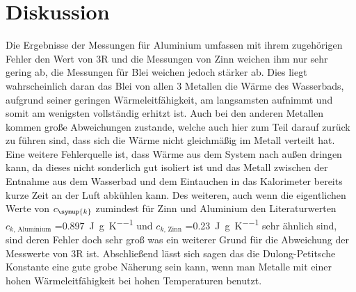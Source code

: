 \section{Diskussion}
\label{sec:Diskussion}
Die Ergebnisse der Messungen für Aluminium umfassen mit
ihrem zugehörigen Fehler den Wert von 3R und die Messungen von Zinn
weichen ihm nur sehr gering ab, die Messungen für Blei weichen jedoch
stärker ab. Dies liegt wahrscheinlich daran das Blei von allen
3 Metallen die Wärme des Wasserbads, aufgrund seiner geringen
Wärmeleitfähigkeit, am langsamsten aufnimmt und somit am wenigsten
vollständig erhitzt ist. Auch bei den anderen Metallen kommen große
Abweichungen zustande, welche auch hier zum Teil darauf zurück zu führen
sind, dass sich die Wärme nicht gleichmäßig im Metall verteilt hat.
Eine weitere Fehlerquelle ist, dass Wärme aus dem System nach außen dringen
kann, da dieses nicht sonderlich gut isoliert ist und das Metall zwischen
der Entnahme aus dem Wasserbad und dem Eintauchen in das Kalorimeter
bereits kurze Zeit an der Luft abkühlen kann. Des weiteren,
auch wenn die eigentlichen Werte von $c_\symup{k}$ zumindest für
Zinn und Aluminium den Literaturwerten\cite{chemie} $c_{k\text{, Aluminium}}$ =\SI{0,897}
{\joule\per\gram\per\kelvin} und $c_{k\text{, Zinn}}$ =\SI{0,23}
{\joule\per\gram\per\kelvin} sehr ähnlich sind, sind deren Fehler doch
sehr groß was ein weiterer Grund für die Abweichung der Messwerte
von 3R ist. Abschließend lässt sich sagen das die Dulong-Petitsche
Konstante eine gute grobe Näherung sein kann, wenn man Metalle mit einer
hohen Wärmeleitfähigkeit bei hohen Temperaturen benutzt.
